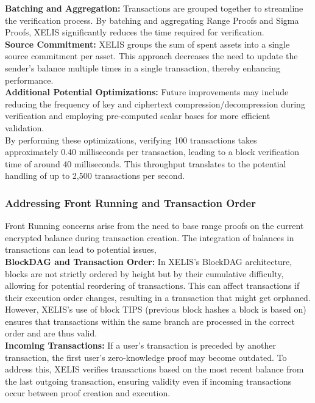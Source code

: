 \documentclass[10pt,a4paper,twocolumn]{article}
\begin{document}
\textbf{Batching and Aggregation:} Transactions are grouped together to streamline the verification process. By batching and aggregating Range Proofs and Sigma Proofs, XELIS significantly reduces the time required for verification.\\

\textbf{Source Commitment:} XELIS groups the sum of spent assets into a single source commitment per asset. This approach decreases the need to update the sender's balance multiple times in a single transaction, thereby enhancing performance.\\

\textbf{Additional Potential Optimizations:} Future improvements may include reducing the frequency of key and ciphertext compression/decompression during verification and employing pre-computed scalar bases for more efficient validation.\\

By performing these optimizations, verifying 100 transactions takes approximately 0.40 milliseconds per transaction, leading to a block verification time of around 40 milliseconds. This throughput translates to the potential handling of up to 2,500 transactions per second.

\subsubsection{Addressing Front Running and Transaction Order}

Front Running concerns arise from the need to base range proofs on the current encrypted balance during transaction creation. The integration of balances in transactions can lead to potential issues,\\

\textbf{BlockDAG and Transaction Order:} In XELIS's BlockDAG architecture, blocks are not strictly ordered by height but by their cumulative difficulty, allowing for potential reordering of transactions. This can affect transactions if their execution order changes, resulting in a transaction that might get orphaned. However, XELIS’s use of block TIPS (previous block hashes a block is based on) ensures that transactions within the same branch are processed in the correct order and are thus valid.\\

\textbf{Incoming Transactions:} If a user's transaction is preceded by another transaction, the first user’s zero-knowledge proof may become outdated. To address this, XELIS verifies transactions based on the most recent balance from the last outgoing transaction, ensuring validity even if incoming transactions occur between proof creation and execution.\\
\end{document}
